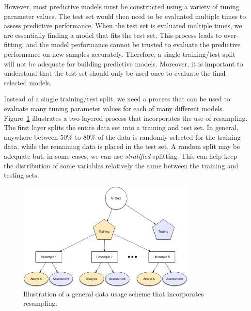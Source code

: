\documentclass[
  letterpaper,
  DIV=11,
  numbers=noendperiod]{scrartcl}
\begin{document}
However, most predictive models must be constructed using a variety of
tuning parameter values. The test set would then need to be evaluated
multiple times to assess predictive performance. When the test set is
evaluated multiple times, we are essentially finding a model that fits
the test set. This process leads to over-fitting, and the model
performance cannot be trusted to evaluate the predictive performance on
new samples accurately. Therefore, a single training/test split will not
be adequate for building predictive models. Moreover, it is important to
understand that the test set should only be used once to evaluate the
final selected models.

Instead of a single training/test split, we need a process that can be
used to evaluate many tuning parameter values for each of many different
models. Figure~\ref{fig-resampling} illustrates a two-layered process
that incorporates the use of resampling. The first layer splits the
entire data set into a training and test set. In general, anywhere
between 50\% to 80\% of the data is randomly selected for the training
data, while the remaining data is placed in the test set. A random split
may be adequate but, in some cases, we can use \emph{stratified}
splitting. This can help keep the distribution of some variables
relatively the same between the training and testing sets.

\begin{figure}[t!]

{\centering \includegraphics[width=0.8\textwidth,height=\textheight]{premade/resampling.pdf}

}

\caption{\label{fig-resampling}Illustration of a general data usage
scheme that incorporates resampling.}

\end{figure}
\end{document}
